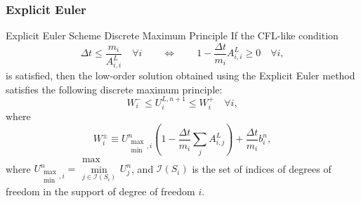 \subsubsection{Explicit Euler}
\begin{theorem}[label={exloworderDMP}]{Explicit Euler Scheme Discrete Maximum Principle}
If the CFL-like condition
\begin{equation}\label{ex_CFL}
   \Delta t \leq \frac{m_i}{A_{i,i}^L}\quad\forall i
   \qquad\Longleftrightarrow\qquad
   1 - \frac{\Delta t}{m_i}A_{i,i}^L \geq 0\quad\forall i,
\end{equation}
is satisfied, then the low-order solution obtained using the Explicit Euler
method satisfies the following discrete maximum principle:
\begin{equation}\label{explicit_max_principle}
   W_i^-\leq U_i^{L,n+1}\leq W_i^+\quad\forall i,
\end{equation}
where
\begin{equation}\label{ex_bounds}
   W_i^\pm\equiv U_{\substack{\max\\\min},i}^n\left(1-\frac{\Delta t}{m_i}
      \sum\limits_j A^L_{i,j}\right)
      + \frac{\Delta t}{m_i}b_i^n,
\end{equation}
where $U_{\substack{\max\\\min},i}^n =
\substack{\max\\\min\limits_{j\in \mathcal{I}(S_i)}}U_j^n$,
and $\mathcal{I}(S_i)$ is the set of indices of degrees of freedom in the
support of degree of freedom $i$.
\end{theorem}

